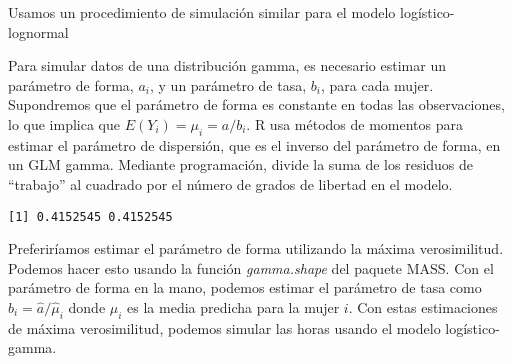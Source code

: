 \documentclass[
  letterpaper,
  DIV=11,
  numbers=noendperiod]{scrreprt}
\newenvironment{Shaded}{\begin{snugshade}}{\end{snugshade}}
\newcommand{\DecValTok}[1]{\textcolor[rgb]{0.68,0.00,0.00}{#1}}
\newcommand{\FunctionTok}[1]{\textcolor[rgb]{0.28,0.35,0.67}{#1}}
\newcommand{\NormalTok}[1]{\textcolor[rgb]{0.00,0.23,0.31}{#1}}
\newcommand{\OtherTok}[1]{\textcolor[rgb]{0.00,0.23,0.31}{#1}}
\newcommand{\SpecialCharTok}[1]{\textcolor[rgb]{0.37,0.37,0.37}{#1}}
\begin{document}
Usamos un procedimiento de simulación similar para el modelo
logístico-lognormal

\begin{Shaded}
\end{Shaded}

Para simular datos de una distribución gamma, es necesario estimar un
parámetro de forma, \(a_i\), y un parámetro de tasa, \(b_i\), para cada
mujer. Supondremos que el parámetro de forma es constante en todas las
observaciones, lo que implica que \(E(Y_i)=\mu_i=a/b_i\). R usa métodos
de momentos para estimar el parámetro de dispersión, que es el inverso
del parámetro de forma, en un GLM gamma. Mediante programación, divide
la suma de los residuos de ``trabajo'' al cuadrado por el número de
grados de libertad en el modelo.

\begin{Shaded}
\end{Shaded}

\begin{verbatim}
[1] 0.4152545 0.4152545
\end{verbatim}

Preferiríamos estimar el parámetro de forma utilizando la máxima
verosimilitud. Podemos hacer esto usando la función \emph{gamma.shape}
del paquete MASS. Con el parámetro de forma en la mano, podemos estimar
el parámetro de tasa como \(\widehat{b}_i=\widehat{a}/\widehat{\mu}_i\)
donde \(\widehat{\mu}_i\) es la media predicha para la mujer \(i\). Con
estas estimaciones de máxima verosimilitud, podemos simular las horas
usando el modelo logístico-gamma.
\end{document}
